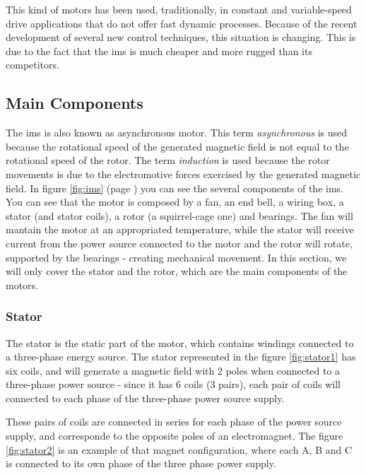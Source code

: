 This kind of motors has been used, traditionally, in constant and variable-speed drive applications that do not offer fast dynamic processes. Because of the recent development of several new control techniques, this situation is changing. This is due to the fact that the \acrfull{ims} is much cheaper and more rugged than its competitors.

\subsection{Main Components}

The \acrshort{ims} is also known as asynchronous motor. This term \emph{asynchronous} is used because the rotational speed of the generated magnetic field is not equal to the rotational speed of the rotor. The term \emph{induction} is used because the rotor movements is due to the electromotive forces exercised by the generated magnetic field.
In figure \ref{fig:ims} (page \pageref{fig:ims}) you can see the several components of the \acrshort{ims}. You can see that the motor is composed by a fan, an end bell, a wiring box, a stator (and stator coils), a rotor (a squirrel-cage one) and bearings. The fan will mantain the motor at an appropriated temperature, while the stator will receive current from the power source connected to the motor and the rotor will rotate, supported by the bearings - creating mechanical movement.
In this section, we will only cover the stator and the rotor, which are the main components of the motors. 

\subsubsection{Stator}

The stator is the static part of the motor, which contains windings connected to a three-phase energy source. The stator represented in the figure \ref{fig:stator1} has six coils, and will generate a magnetic field with 2 poles when connected to a three-phase power source - since it has 6 coils (3 pairs), each pair of coils will connected to each phase of the three-phase power source supply.

These pairs of coils are connected in series for each phase of the power source supply, and corresponde to the opposite poles of an electromagnet. The figure \ref{fig:stator2} is an example of that magnet configuration, where each A, B and C is connected to its own phase of the three phase power supply.



